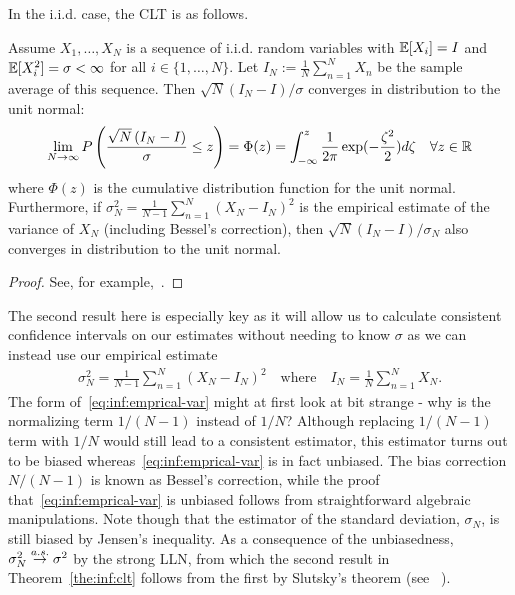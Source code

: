 In the i.i.d. case, the CLT is as follows.
\begin{theorem}
	\label{the:inf:clt}
Assume $X_1,\dots,X_N$ is a sequence of i.i.d. random variables with 
$\mathbb{E} [X_i] = I$ and $\mathbb{E}[X_i^2]=\sigma<\infty$ for all  $i \in \{1,\dots,N\}$. Let 
$I_N := \frac{1}{N} \sum_{n=1}^{N} X_n$ be the
sample average of this sequence.  Then $\sqrt{N}\left(I_N-I\right)/\sigma$ converges
in distribution to the unit normal:
\begin{align}
\lim\limits_{N\rightarrow\infty} P\left(\frac{\sqrt{N}\left(I_N-I\right)}{\sigma} \le z\right)
=\Phi(z)= \int_{-\infty}^{z} \frac{1}{2\pi} \exp(-\frac{\zeta^2}{2}) d\zeta \quad \forall z\in\mathbb{R}
\end{align}
where $\Phi(z)$ is the cumulative distribution function for the unit normal.
Furthermore, if $\sigma_N^2 = \frac{1}{N-1} \sum_{n=1}^{N} \left(X_N-I_N\right)^2$ is
the empirical estimate of the variance of $X_N$ (including Bessel's correction), then
$\sqrt{N}\left(I_N-I\right)/\sigma_N$ also converges
in distribution to the unit normal.
\end{theorem}
\begin{proof}
	See, for example,~\cite{durrett2010probability}.
\end{proof}
The second result here is especially key as it will allow us to calculate consistent confidence intervals
on our estimates without needing to know $\sigma$ as we can instead use our empirical estimate
\begin{align}
	\label{eq:inf:emprical-var}
	\sigma_N^2 = \frac{1}{N-1} \sum_{n=1}^{N} \left(X_N-I_N\right)^2 \quad \mathrm{where} 
	\quad I_N = \frac{1}{N}\sum_{n=1}^{N}X_N.
\end{align}
The form of~\eqref{eq:inf:emprical-var} might at first look at bit strange - why is the normalizing
term $1/(N-1)$ instead of $1/N$?  Although replacing $1/(N-1)$ term with $1/N$ would still lead
to a consistent estimator, this estimator turns out to be biased whereas~\eqref{eq:inf:emprical-var}
is in fact unbiased.  The bias correction $N/(N-1)$ is known as Bessel's correction, while the proof
that~\eqref{eq:inf:emprical-var} is unbiased follows from straightforward algebraic manipulations.
Note though that the estimator of the standard deviation, $\sigma_N$, is still biased by Jensen's
inequality.
As a consequence of the unbiasedness, $\sigma_N^2 \overset{a.s.}{\to} \sigma^2$ by the strong LLN, 
from which the second result
in Theorem~\ref{the:inf:clt} follows from the first by Slutsky's theorem (see ~\cite{durrett2010probability}).

